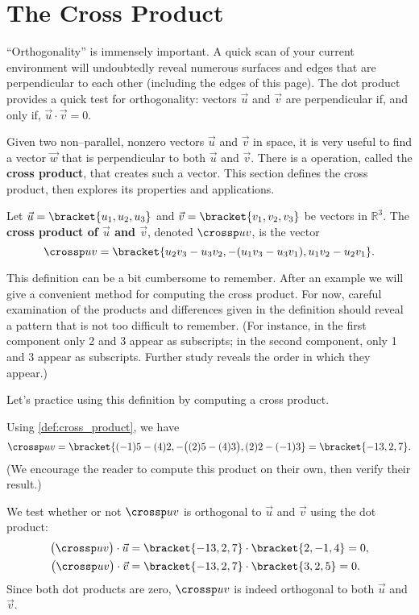 \section{The Cross Product}\label{sec:cross_product}

``Orthogonality'' is immensely important. A quick scan of your current environment will undoubtedly reveal numerous surfaces and edges that are perpendicular to each other (including the edges of this page). The dot product provides a quick test for orthogonality:  vectors $\vec u$ and $\vec v$ are perpendicular if, and only if, $\vec u\cdot\vec v=0$. 

Given two non--parallel, nonzero vectors $\vec u$ and $\vec v$ in space, it is very useful to find a vector $\vec w$ that is perpendicular to both $\vec u$ and $\vec v$. There is a operation, called the \textbf{cross product}, that creates such a vector. This section defines the cross product, then explores its properties and applications.

{Let $\vec u =\bracket{u_1,u_2,u_3}$ and $\vec v = \bracket{v_1,v_2,v_3}$ be vectors in $\mathbb{R}^3$. The \textbf{cross product of $\vec u$ and $\vec v$}, denoted $\crossp uv$, is the vector
\[\crossp uv = \bracket{u_2v_3-u_3v_2,-(u_1v_3-u_3v_1),u_1v_2-u_2v_1}.\]}

This definition can be a bit cumbersome to remember. After an example we will give a convenient method for computing the cross product. For now, careful examination of the products and differences given in the definition should reveal a pattern that is not too difficult to remember. (For instance, in the first component only 2 and 3 appear as subscripts; in the second component, only 1 and 3 appear as subscripts. Further study reveals the order in which they appear.)


Let's practice using this definition by computing a cross product.

{Using \autoref{def:cross_product}, we have
\[
\crossp uv = \bracket{(-1)5-(4)2,-\big((2)5-(4)3\big), (2)2-(-1)3}=\bracket{-13,2,7}.
\] 
(We encourage the reader to compute this product on their own, then verify their result.)

We test whether or not $\crossp uv$ is orthogonal to $\vec u$ and $\vec v$ using the dot product:
\begin{align*}
\big(\crossp uv\big) \cdot \vec u &=\bracket{-13,2,7}\cdot\bracket{2,-1,4}=0, \\
\big(\crossp uv\big) \cdot \vec v &=\bracket{-13,2,7}\cdot\bracket{3,2,5}=0.
\end{align*}
Since both dot products are zero, $\crossp uv$ is indeed orthogonal to both $\vec u$ and $\vec v$.}

